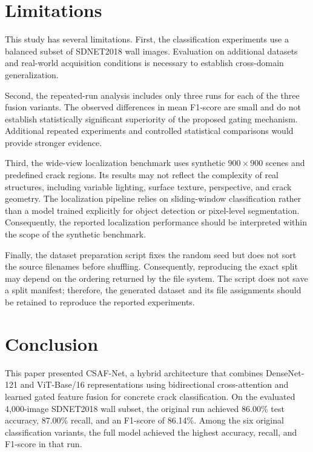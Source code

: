 \documentclass[12pt,a4paper,oneside]{article}
\begin{document}
\section{Limitations}

This study has several limitations. First, the classification
experiments use a balanced subset of SDNET2018 wall images.
Evaluation on additional datasets and real-world acquisition
conditions is necessary to establish cross-domain generalization.

Second, the repeated-run analysis includes only three runs for
each of the three fusion variants. The observed differences in
mean F1-score are small and do not establish statistically
significant superiority of the proposed gating mechanism.
Additional repeated experiments and controlled statistical
comparisons would provide stronger evidence.

Third, the wide-view localization benchmark uses synthetic
$900 \times 900$ scenes and predefined crack regions. Its results
may not reflect the complexity of real structures, including
variable lighting, surface texture, perspective, and crack
geometry. The localization pipeline relies on sliding-window
classification rather than a model trained explicitly for
object detection or pixel-level segmentation. Consequently,
the reported localization performance should be interpreted
within the scope of the synthetic benchmark.

Finally, the dataset preparation script fixes the random seed
but does not sort the source filenames before shuffling.
Consequently, reproducing the exact split may depend on the
ordering returned by the file system. The script does not save
a split manifest; therefore, the generated dataset and its
file assignments should be retained to reproduce the reported
experiments.

\section{Conclusion}

This paper presented CSAF-Net, a hybrid architecture that
combines DenseNet-121 and ViT-Base/16 representations using
bidirectional cross-attention and learned gated feature fusion
for concrete crack classification. On the evaluated
4,000-image SDNET2018 wall subset, the original run achieved
86.00\% test accuracy, 87.00\% recall, and an F1-score of
86.14\%. Among the six original classification variants,
the full model achieved the highest accuracy, recall, and
F1-score in that run.
\end{document}
